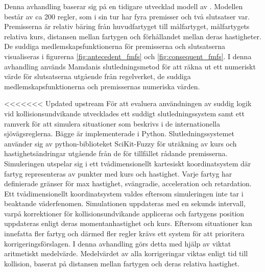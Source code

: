 Denna avhandling baserar sig på en tidigare utvecklad modell av \textcite{perera2010smooth_param,perera2012intelligent}. Modellen består av ca 200 regler, som i sin tur har fyra premisser och två slutsatser var.  Premisserna är relativ bäring från huvudfartyget till målfartyget, målfartygets relativa kurs, distansen mellan fartygen och förhållandet mellan deras hastigheter. De suddiga medlemskapsfunktionerna för premisserna och slutsatserna visualiseras i figurerna \ref{fig:antecedent_fmfs} och \ref{fig:consequent_fmfs}.  I denna avhandling används Mamdanis  slutledningsmetod för att räkna ut ett numeriskt värde för slutsatserna utgående från regelverket, de suddiga medlemskapsfunktionerna och  premissernas numeriska värden.


<<<<<<< Updated upstream
För att evaluera användningen av suddig logik vid kollisionsundvikande utvecklades ett suddigt slutledningssystem samt ett ramverk för att simulera situationer som beskrivs i de  internationella sjövägsreglerna. Bägge är implementerade i Python. Slutledningssystemet använder sig av python-biblioteket SciKit-Fuzzy \cite{josh_warner_2017_1002946} för uträkning av kurs och hastighetsändringar utgående från  de för tillfället rådande premisserna. Simuleringen utspelar sig i ett tvådimensionellt kartesiskt koordinatsystem där fartyg representeras av punkter med  kurs och hastighet. Varje fartyg har definierade gränser för max hastighet, svängradie, acceleration och retardation.  Ett tvådimensionellt koordinatsystem valdes eftersom simuleringen inte tar i beaktande väderfenomen. Simulationen uppdateras med en sekunds intervall, varpå  korrektioner för kollisionsundvikande appliceras och fartygens position uppdateras enligt deras momentanhastighet och kurs.   Eftersom situationer kan innefatta fler fartyg och därmed fler regler krävs ett system för att prioritera korrigeringsförslagen. I denna avhandling görs detta med hjälp av viktat aritmetiskt medelvärde. Medelvärdet av alla korrigeringar viktas enligt tid till kollision, baserat på  distansen mellan fartygen och deras relativa hastighet.




